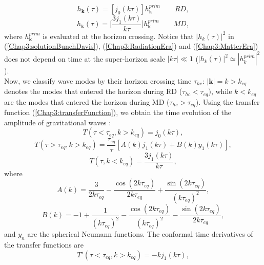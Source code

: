 \documentclass[11pt,a4paper,twoside]{book}
\begin{document}
\begin{equation}
	\label{Chap3:solutionRadiationEra}
	h_{\textbf{k}}(\tau)=[j_{0}(k\tau)]h_{\textbf{k}}^{prim}
	\qquad
	RD,
\end{equation}
\begin{equation}
	\label{Chap3:solutionMatterEra}
	h_{\textbf{k}}(\tau) = \Big [\frac{3 j_{1}(k\tau)}{k\tau}\Big] h_{\textbf{k}}^{prim}
	\qquad
	MD,
\end{equation}
where $ h_{\textbf{k}}^{prim} $ is evaluated at the horizon crossing.
Notice that $ |h_{k}(\tau)|^{2} $ in (\ref{Chap3:solutionBunchDavis}), (\ref{Chap3:RadiationEra}) and (\ref{Chap3:MatterEra}) does not depend on time at the super-horizon scale $ |k\tau| \ll 1$  ($ |h_{k}(\tau)|^{2} \simeq|h_{k}^{prim}|^{2} $).\\
Now, we classify wave modes by their horizon crossing time  $\tau_{hc}$: 
 $ |\textbf{k}|= k > k_{eq} $ denotes the modes that entered the horizon during RD ($ \tau_{hc} < \tau_{eq} $), while $ k < k_{eq} $ are the modes that entered the horizon during MD ($ \tau_{hc} > \tau_{eq} $). Using the transfer function (\ref{Chap3:transferFunction}), we obtain the time evolution of the amplitude of gravitational waves \cite{Chap3:GW_Watanabe_Komatsu}:
 \begin{equation}
 	\label{Chap3:TF1}
 	T(\tau < \tau_{eq}, k>k_{eq}) = j_{0}(k\tau),
 \end{equation}
\begin{equation}
	\label{Chap3:TF2}
     T(\tau > \tau_{eq}, k > k_{eq}) = \frac{\tau_{eq}}{\tau}[A(k)j_{1}(k\tau) + B(k)y_{1}(k\tau)],
\end{equation}
\begin{equation}
	\label{Chap3:TF3}
	T(\tau,k<k_{eq}) = \frac{3j_{1}(k\tau)}{k\tau},
\end{equation}
where
\begin{equation}
\label{Chap3:A(k)}
A(k) = \frac{3}{2k\tau_{eq}}-\frac{\cos(2k\tau_{eq})}{2k\tau_{eq}} + \frac{\sin(2k\tau_{eq})}{(k\tau_{eq})^{2}} ,
\end{equation}
\begin{equation}
	\label{Chap3:B(k)}
	B(k) = -1 + \frac{1}{(k\tau_{eq})^{2}} - \frac{\cos(2k\tau_{eq})}{(k\tau_{eq})^{2}} - \frac{\sin (2k\tau_{eq})}{2k\tau_{eq}},
\end{equation}
and $ y_{n} $ are the spherical Neumann functions. The conformal time derivatives  of the transfer functions are
\begin{equation}
	\label{Chap3:TF1der}
	T'(\tau < \tau_{eq}, k>k_{eq}) = -kj_{1}(k\tau),
\end{equation}
\end{document}
